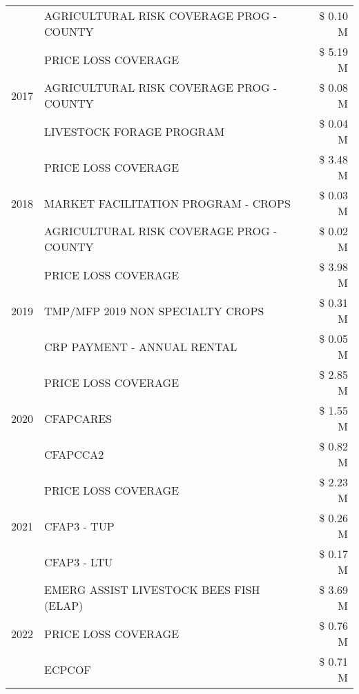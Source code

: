 \begin{tabular}{llr}
 & AGRICULTURAL RISK COVERAGE PROG - COUNTY & \$ 0.10 M \\
\cline{1-3}
\multirow[t]{3}{*}{2017} & PRICE LOSS COVERAGE & \$ 5.19 M \\
 & AGRICULTURAL RISK COVERAGE PROG - COUNTY & \$ 0.08 M \\
 & LIVESTOCK FORAGE PROGRAM & \$ 0.04 M \\
\cline{1-3}
\multirow[t]{3}{*}{2018} & PRICE LOSS COVERAGE & \$ 3.48 M \\
 & MARKET FACILITATION PROGRAM - CROPS & \$ 0.03 M \\
 & AGRICULTURAL RISK COVERAGE PROG - COUNTY & \$ 0.02 M \\
\cline{1-3}
\multirow[t]{3}{*}{2019} & PRICE LOSS COVERAGE & \$ 3.98 M \\
 & TMP/MFP 2019 NON SPECIALTY CROPS & \$ 0.31 M \\
 & CRP PAYMENT - ANNUAL RENTAL & \$ 0.05 M \\
\cline{1-3}
\multirow[t]{3}{*}{2020} & PRICE LOSS COVERAGE & \$ 2.85 M \\
 & CFAPCARES & \$ 1.55 M \\
 & CFAPCCA2 & \$ 0.82 M \\
\cline{1-3}
\multirow[t]{3}{*}{2021} & PRICE LOSS COVERAGE & \$ 2.23 M \\
 & CFAP3 - TUP & \$ 0.26 M \\
 & CFAP3 - LTU & \$ 0.17 M \\
\cline{1-3}
\multirow[t]{3}{*}{2022} & EMERG ASSIST LIVESTOCK BEES FISH (ELAP) & \$ 3.69 M \\
 & PRICE LOSS COVERAGE & \$ 0.76 M \\
 & ECPCOF & \$ 0.71 M \\
\cline{1-3}
\bottomrule
\end{tabular}
